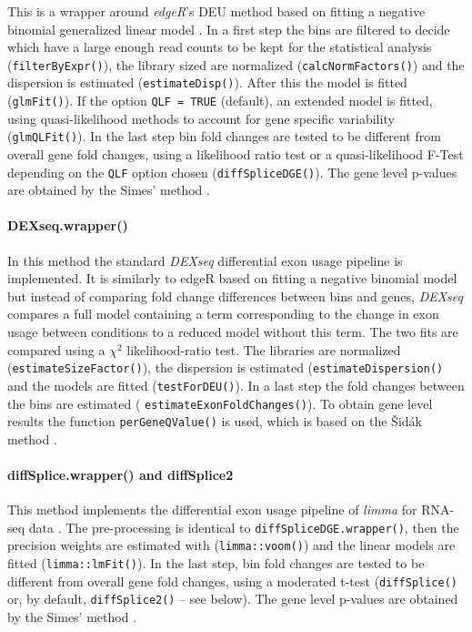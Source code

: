 \documentclass{bmcart}
\begin{document}
This is a wrapper around \textit{edgeR}'s DEU method based on fitting a negative binomial generalized linear model \cite{Robinson2009EdgeR:Data}. In a first step the bins are filtered to decide which have a large enough read counts to be kept for the statistical analysis (\texttt{filterByExpr()}), the library sized are normalized (\texttt{calcNormFactors()}) and the dispersion is estimated (\texttt{estimateDisp()}). After this the model is fitted (\texttt{glmFit()}). If the option \texttt{QLF = TRUE} (default), an extended model is fitted, using quasi-likelihood methods to account for gene specific variability (\texttt{glmQLFit()}). In the last step bin fold changes are tested to be different from overall gene fold changes, using a likelihood ratio test or a quasi-likelihood F-Test depending on the \texttt{QLF} option chosen (\texttt{diffSpliceDGE()}).  The gene level p-values are obtained by the Simes' method \cite{Simes1986AnSignificance}. 

\paragraph{DEXseq.wrapper()}

In this method the standard \textit{DEXseq} differential exon usage pipeline \cite{Anders2012DetectingData} is implemented. It is similarly to edgeR based on fitting a negative binomial model but instead of comparing fold change differences between bins and genes, \textit{DEXseq} compares a full model containing a term corresponding to the change in exon usage between conditions to a reduced model without this term. The two fits are compared using a $\chi^2$ likelihood-ratio test. The libraries are normalized (\texttt{estimateSizeFactor()}), the dispersion is estimated (\texttt{estimateDispersion()} and the models are fitted (\texttt{testForDEU()}). In a last step the fold changes between the bins are estimated ( \texttt{estimateExonFoldChanges()}). To obtain gene level results the function \texttt{perGeneQValue()} is used, which is based on the Šidák method \cite{Sidak1967RectangularDistributions}.

\paragraph{diffSplice.wrapper() and diffSplice2}
\label{sec:diffSplice2}
This method implements the differential exon usage pipeline of \textit{limma} for RNA-seq data \cite{Ritchie2015LimmaStudies}. The pre-processing is identical to \texttt{diffSpliceDGE.wrapper()}, then the precision weights are estimated with (\texttt{limma::voom()}) and the linear models are fitted (\texttt{limma::lmFit()}). In the last step, bin fold changes are tested to be different from overall gene fold changes, using a moderated t-test (\texttt{diffSplice()} or, by default, \texttt{diffSplice2()} -- see below). The gene level p-values are obtained by the Simes' method \cite{Simes1986AnSignificance}.
\end{document}
